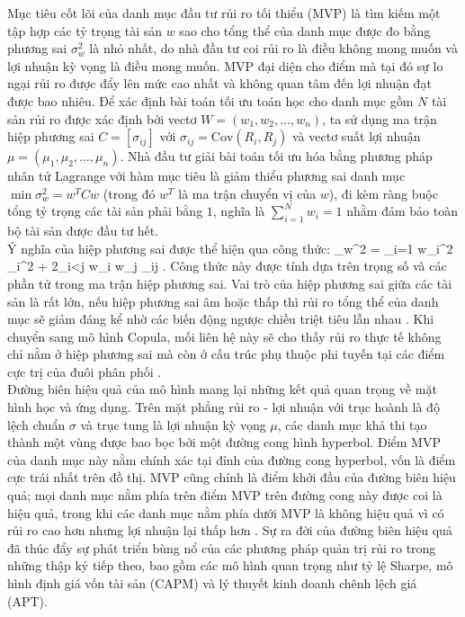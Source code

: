 Mục tiêu cốt lõi của danh mục đầu tư rủi ro tối thiểu (MVP) là tìm kiếm một tập hợp các tỷ trọng tài sản $w$ sao cho tổng thể của danh mục được đo bằng phương sai $\sigma_w^2$ là nhỏ nhất, do nhà đầu tư coi rủi ro là điều không mong muốn và lợi nhuận kỳ vọng là điều mong muốn. MVP đại diện cho điểm mà tại đó sự lo ngại rủi ro được đẩy lên mức cao nhất và không quan tâm đến lợi nhuận đạt được bao nhiêu. Để xác định bài toán tối ưu toán học cho danh mục gồm $N$ tài sản rủi ro được xác định bởi vectơ $W = (w_1, w_2, \dots, w_n)$, ta sử dụng ma trận hiệp phương sai $C = [\sigma_{ij}]$ với $\sigma_{ij} = \text{Cov}(R_i, R_j)$ và vectơ suất lợi nhuận $\mu = (\mu_1, \mu_2, \dots, \mu_n)$. Nhà đầu tư giải bài toán tối ưu hóa bằng phương pháp nhân tử Lagrange với hàm mục tiêu là giảm thiểu phương sai danh mục $\min \sigma_w^2 = w^T C w$ (trong đó $w^T$ là ma trận chuyển vị của $w$), đi kèm ràng buộc tổng tỷ trọng các tài sản phải bằng $1$, nghĩa là $\sum_{i=1}^{N} w_i = 1$ nhằm đảm bảo toàn bộ tài sản được đầu tư hết.\\
Ý nghĩa của hiệp phương sai được thể hiện qua công thức:
\bea
\sigma_w^2 = \sum_{i=1} w_i^2 \sigma_i^2 + 2\sum_{i<j} w_i w_j \sigma_{ij} .
\eea
Công thức này được tính dựa trên trọng số và các phần tử trong ma trận hiệp phương sai. Vai trò của hiệp phương sai giữa các tài sản là rất lớn, nếu hiệp phương sai âm hoặc thấp thì rủi ro tổng thể của danh mục sẽ giảm đáng kể nhờ các biến động ngược chiều triệt tiêu lẫn nhau \cite{macquarie2024exercise}. Khi chuyển sang mô hình Copula, mối liên hệ này sẽ cho thấy rủi ro thực tế không chỉ nằm ở hiệp phương sai mà còn ở cấu trúc phụ thuộc phi tuyến tại các điểm cực trị của đuôi phân phối \cite{mcneil2015quantitative}.\\
Đường biên hiệu quả của mô hình mang lại những kết quả quan trọng về mặt hình học và ứng dụng. Trên mặt phẳng rủi ro - lợi nhuận với trục hoành là độ lệch chuẩn $\sigma$ và trục tung là lợi nhuận kỳ vọng $\mu$, các danh mục khả thi tạo thành một vùng được bao bọc bởi một đường cong hình hyperbol. Điểm MVP của danh mục này nằm chính xác tại đỉnh của đường cong hyperbol, vốn là điểm cực trái nhất trên đồ thị. MVP cũng chính là điểm khởi đầu của đường biên hiệu quả; mọi danh mục nằm phía trên điểm MVP trên đường cong này được coi là hiệu quả, trong khi các danh mục nằm phía dưới MVP là không hiệu quả vì có rủi ro cao hơn nhưng lợi nhuận lại thấp hơn \cite{arratia2014computational}. Sự ra đời của đường biên hiệu quả đã thúc đẩy sự phát triển bùng nổ của các phương pháp quản trị rủi ro trong những thập kỷ tiếp theo, bao gồm các mô hình quan trọng như tỷ lệ Sharpe, mô hình định giá vốn tài sản (CAPM) và lý thuyết kinh doanh chênh lệch giá (APT).